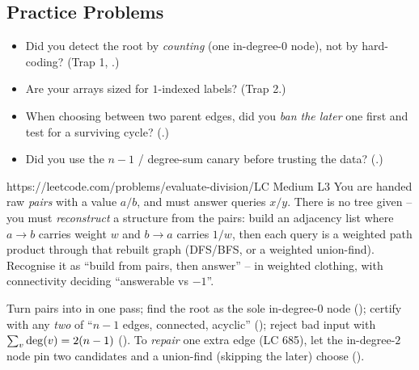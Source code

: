 \subsection{Practice Problems}

\begin{stuckbox}
\begin{itemize}[nosep, leftmargin=1.4em]
  \item Did you detect the root by \emph{counting} (one in-degree-$0$ node), not by hard-coding?
        (Trap 1, .)
  \item Are your arrays sized for $1$-indexed labels? (Trap 2.)
  \item When choosing between two parent edges, did you \emph{ban the later} one first and test for a
        surviving cycle? (.)
  \item Did you use the $n-1$ / degree-sum canary before trusting the data? (.)
\end{itemize}
\end{stuckbox}

\begin{practiceset}
    {https://leetcode.com/problems/evaluate-division/}{LC Medium L3}
    {You are handed raw \emph{pairs}  with a value $a/b$, and must answer
    queries $x/y$. There is no tree given -- you must \emph{reconstruct} a structure from the pairs:
    build an adjacency list where $a\!\to\!b$ carries weight $w$ and $b\!\to\!a$ carries $1/w$, then
    each query is a weighted path product through that rebuilt graph (DFS/BFS, or a weighted
    union-find). Recognise it as ``build  from pairs, then answer'' -- 
    in weighted clothing, with connectivity deciding ``answerable vs $-1$''.}
\end{practiceset}

\begin{recallbox}
Turn pairs into  in one pass; find the root as the sole in-degree-$0$ node
(); certify with any \emph{two} of ``$n-1$ edges, connected, acyclic''
(); reject bad input with $\sum_v\operatorname{deg}(v)=2(n-1)$ (). To \emph{repair}
one extra edge (LC 685), let the in-degree-$2$ node pin two candidates and a union-find (skipping the
later) choose ().
\end{recallbox}
